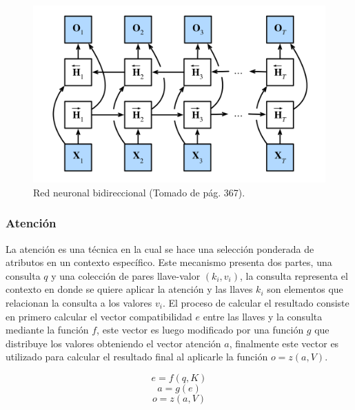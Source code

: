 \begin{figure}[h!]
	\begin{center}
		\begin{center}
			\includegraphics[scale=.3]{Graphics/rnn_bidirectional.png}
        \end{center}
	    \caption{Red neuronal bidireccional (Tomado de \cite{d2l} pág. 367).}\label{fig:rnn_bidirectional}
	\end{center}
\end{figure}


\subsubsection{Atención}

La atención es una técnica en la cual se hace una selección ponderada de atributos en un contexto específico. 
Este mecanismo presenta dos partes, una consulta $q$ y una colección de pares llave-valor $(k_i, v_i)$, la 
consulta representa el contexto en donde se quiere aplicar la atención y las llaves $k_i$ son elementos que 
relacionan la consulta a los valores $v_i$. El proceso de calcular el resultado consiste en primero calcular 
el vector compatibilidad $e$ entre las llaves y la consulta mediante la función $f$, este vector es luego 
modificado por una función $g$ que distribuye los valores obteniendo el vector atención $a$, finalmente 
este vector es utilizado para calcular el resultado final al aplicarle la función $o = z(a, V)$.

\begin{equation}
	e = f(q, K)
\end{equation}
\begin{equation}
	a = g(e)
\end{equation}
\begin{equation}
	o = z(a, V)
\end{equation}

